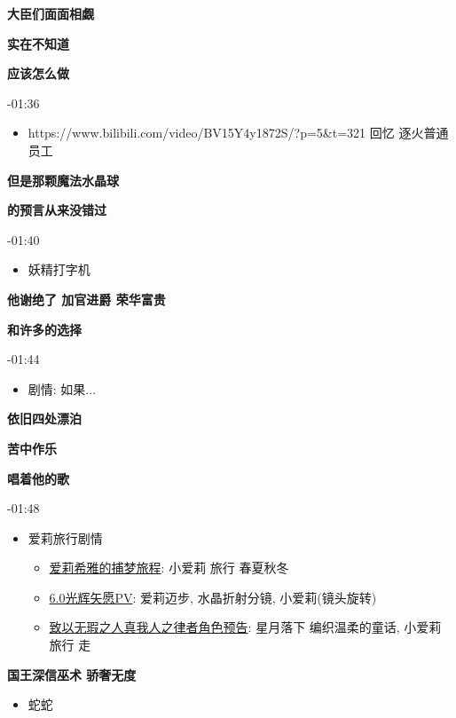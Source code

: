 \documentclass[a4paper]{article}
\begin{document}
\textbf{大臣们面面相觑}

\textbf{实在不知道}

\textbf{应该怎么做}

-01:36

\begin{itemize}
    \item https://www.bilibili.com/video/BV15Y4y1872S/?p=5&t=321 回忆 逐火普通员工
\end{itemize}

\textbf{但是那颗魔法水晶球}

\textbf{的预言从来没错过}

-01:40

\begin{itemize}
    \item 妖精打字机
\end{itemize}

\textbf{他谢绝了 加官进爵 荣华富贵}

\textbf{和许多的选择}

-01:44

\begin{itemize}
    \item 剧情: 如果...
\end{itemize}

\textbf{依旧四处漂泊}

\textbf{苦中作乐}

\textbf{唱着他的歌}

-01:48

\begin{itemize}
    \item 爱莉旅行剧情
    \begin{itemize}
        \item \href{https://www.bilibili.com/video/BV1ZW4y1t7Zf/}{爱莉希雅的捕梦旅程}: 小爱莉 旅行 春夏秋冬
        \item \href{https://www.bilibili.com/video/BV1Mg411k7U5/}{6.0光辉矢愿PV}: 爱莉迈步, 水晶折射分镜, 小爱莉(镜头旋转)
        \item \href{https://www.bilibili.com/video/BV1DS4y1t7rs/}{致以无瑕之人真我人之律者角色预告}: 星月落下 编织温柔的童话, 小爱莉 旅行 走
    \end{itemize}
\end{itemize}

\textbf{国王深信巫术 骄奢无度}

\begin{itemize}
    \item 蛇蛇
\end{itemize}
\end{document}
